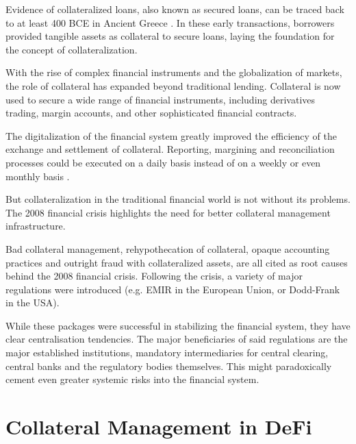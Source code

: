 \documentclass[sigconf,nonacm]{acmart}
\begin{document}
Evidence of collateralized loans, also known as secured loans, can be traced back to at least 400 BCE in Ancient Greece \cite{millett2002lending}.
In these early transactions, borrowers provided tangible assets as collateral to secure loans, laying the foundation for the concept of collateralization.

With the rise of complex financial instruments and the globalization of markets, the role of collateral has expanded beyond traditional lending.
Collateral is now used to secure a wide range of financial instruments, including derivatives trading, margin accounts,
and other sophisticated financial contracts.

The digitalization of the financial system greatly improved the efficiency of the exchange and settlement of collateral.
Reporting, margining and reconciliation processes could be executed on a daily basis instead of on a weekly or even monthly basis \cite{simmons2019collateral}.

But collateralization in the traditional financial world is not without its problems.
The 2008 financial crisis highlights the need for better collateral management infrastructure.

Bad collateral management, rehypothecation of collateral, opaque accounting practices
and outright fraud with collateralized assets, are all cited as root causes\cite{hellwig2008causes} behind the 2008 financial crisis.
Following the crisis, a variety of major regulations were introduced (e.g. EMIR in the European Union, or Dodd-Frank in the USA).

While these packages were successful in stabilizing the financial system, they have clear centralisation tendencies\cite{gregory2014central}.
The major beneficiaries of said regulations are the major established institutions, mandatory intermediaries for central clearing,
central banks and the regulatory bodies themselves.
This might paradoxically cement even greater systemic risks into the financial system.

\section{Collateral Management in DeFi}
\label{sec:collateral-management-in-DeFi}
\end{document}
